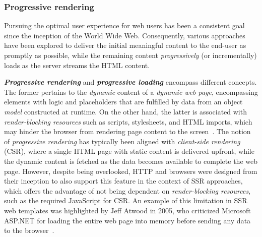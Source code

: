 \subsubsection{Progressive rendering}

Pursuing the optimal user experience for web users has been a consistent goal
since the inception of the World Wide Web. Consequently, various approaches
have been explored to deliver the initial meaningful content to the end-user as
promptly as possible, while the remaining content \textit{progressively} (or
incrementally) loads as the server streams the HTML content.

\textit{\textbf{Progressive rendering}} and \textit{\textbf{progressive loading}}
encompass different concepts. The former pertains to the \textit{dynamic} content of a
\textit{dynamic web page}, encompassing elements with logic and placeholders
that are fulfilled by data from an object \textit{model} constructed at runtime.
On the other hand, the latter is associated with \textit{render-blocking
  resources} such as scripts, stylesheets, and HTML imports, which may hinder the
browser from rendering page content to the screen~\cite{progressive-2022}.
The notion of \textit{progressive rendering} has typically been aligned with
\textit{client-side rendering} (CSR), where a single HTML page with static
content is delivered upfront, while the dynamic content is fetched as the data
becomes available to complete the web page.
However, despite being overlooked, HTTP and browsers were designed from their
inception to also support this feature in the context of SSR approaches,
which offers the advantage of not being dependent on
\textit{render-blocking resources}, such as the required JavaScript for CSR.
An example of this limitation in SSR web templates was highlighted by Jeff
Atwood in 2005, who criticized Microsoft ASP.NET for loading the entire web
page into memory before sending any data to the browser~\cite{pssr2005}.
